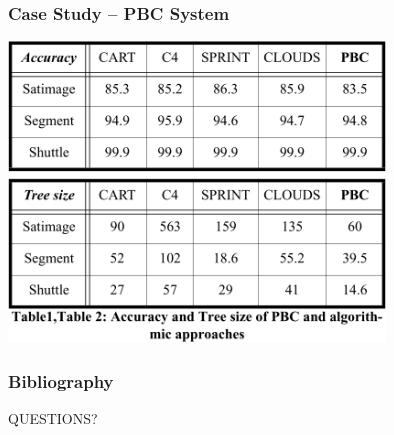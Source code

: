 \documentclass[xcolor=svgnames]{beamer}
\begin{document}
\begin{frame}
	\frametitle{Case Study -- PBC System}
	\begin{center}
		\includegraphics[width=0.75\textwidth]{img/pbc-results.png}
	\end{center}
\end{frame}
\begin{frame}[allowframebreaks]
	\frametitle<presentation>{Bibliography}
	
	\nocite{Fails2003}
	\nocite{Ankerst1999}
	\nocite{Ware2001}
	
\end{frame}
\begin{frame}
	\begin{center}
		{\Huge QUESTIONS?}
	\end{center}
\end{frame}
\end{document}
